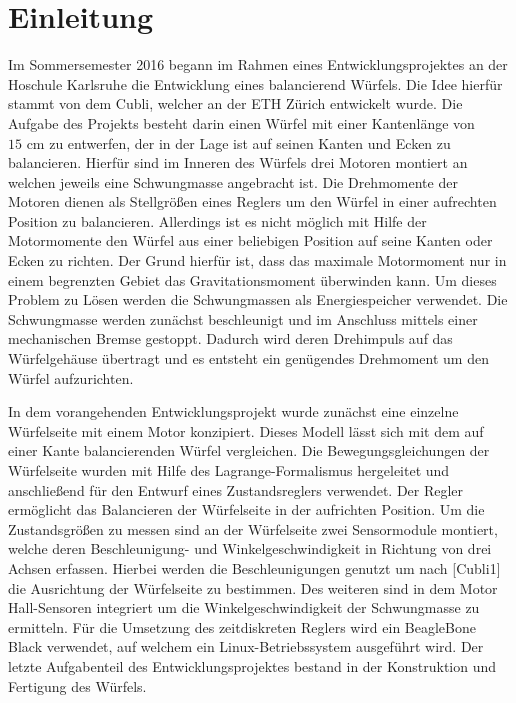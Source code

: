 \chapter{Einleitung}
Im Sommersemester 2016 begann im Rahmen eines Entwicklungsprojektes an der Hoschule Karlsruhe die Entwicklung eines balancierend Würfels. Die Idee hierfür stammt von dem Cubli, welcher an der ETH Zürich entwickelt wurde. Die Aufgabe des Projekts besteht darin einen Würfel mit einer Kantenlänge von $15\text{ cm}$ zu entwerfen, der in der Lage ist auf seinen Kanten und Ecken zu balancieren. Hierfür sind im Inneren des Würfels drei Motoren montiert an welchen jeweils eine Schwungmasse angebracht ist. Die Drehmomente der Motoren dienen als Stellgrößen eines Reglers um den Würfel in einer aufrechten Position zu balancieren. Allerdings ist es nicht möglich mit Hilfe der Motormomente den Würfel aus einer beliebigen Position auf seine Kanten oder Ecken zu richten. Der Grund hierfür ist, dass das maximale Motormoment nur in einem begrenzten Gebiet das Gravitationsmoment überwinden kann. Um dieses Problem zu Lösen werden die Schwungmassen als Energiespeicher verwendet. Die Schwungmasse werden zunächst beschleunigt und im Anschluss mittels einer mechanischen Bremse gestoppt. Dadurch wird deren Drehimpuls auf das Würfelgehäuse übertragt und es entsteht ein genügendes Drehmoment um den Würfel aufzurichten.

In dem vorangehenden Entwicklungsprojekt wurde zunächst eine einzelne Würfelseite mit einem Motor konzipiert. Dieses Modell lässt sich mit dem auf einer Kante balancierenden Würfel vergleichen. Die Bewegungsgleichungen der Würfelseite wurden mit Hilfe des Lagrange-Formalismus hergeleitet und anschließend für den Entwurf eines Zustandsreglers verwendet. Der Regler ermöglicht das Balancieren der Würfelseite in der aufrichten Position. Um die Zustandsgrößen zu messen sind an der Würfelseite zwei Sensormodule montiert, welche deren Beschleunigung- und Winkelgeschwindigkeit in Richtung von drei Achsen erfassen. Hierbei werden die Beschleunigungen genutzt um nach [Cubli1] die Ausrichtung der Würfelseite zu bestimmen. Des weiteren sind in dem Motor Hall-Sensoren integriert um die Winkelgeschwindigkeit der Schwungmasse zu ermitteln. Für die Umsetzung des zeitdiskreten Reglers wird ein BeagleBone Black verwendet, auf welchem ein Linux-Betriebssystem ausgeführt wird. Der letzte Aufgabenteil des Entwicklungsprojektes bestand in der Konstruktion und Fertigung des Würfels.

